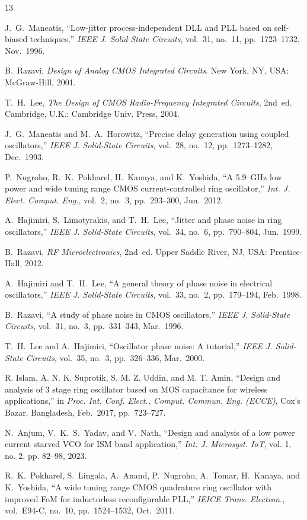 \documentclass[conference,a4paper]{IEEEtran} %
\begin{document}
\begin{thebibliography}{13}

J.~G.~Maneatis, ``Low-jitter process-independent DLL and PLL based on self-biased techniques,'' \emph{IEEE J. Solid-State Circuits}, vol.~31, no.~11, pp.~1723--1732, Nov.~1996.

B.~Razavi, \emph{Design of Analog CMOS Integrated Circuits}. New York, NY, USA: McGraw-Hill, 2001.

T.~H.~Lee, \emph{The Design of CMOS Radio-Frequency Integrated Circuits}, 2nd~ed. Cambridge, U.K.: Cambridge Univ. Press, 2004.

J.~G.~Maneatis and M.~A.~Horowitz, ``Precise delay generation using coupled oscillators,'' \emph{IEEE J. Solid-State Circuits}, vol.~28, no.~12, pp.~1273--1282, Dec.~1993.

P.~Nugroho, R.~K.~Pokharel, H.~Kanaya, and K.~Yoshida, ``A 5.9~GHz low power and wide tuning range CMOS current-controlled ring oscillator,'' \emph{Int. J. Elect. Comput. Eng.}, vol.~2, no.~3, pp.~293--300, Jun.~2012.

A.~Hajimiri, S.~Limotyrakis, and T.~H.~Lee, ``Jitter and phase noise in ring oscillators,'' \emph{IEEE J. Solid-State Circuits}, vol.~34, no.~6, pp.~790--804, Jun.~1999.

B.~Razavi, \emph{RF Microelectronics}, 2nd~ed. Upper Saddle River, NJ, USA: Prentice-Hall, 2012.

A.~Hajimiri and T.~H.~Lee, ``A general theory of phase noise in electrical oscillators,'' \emph{IEEE J. Solid-State Circuits}, vol.~33, no.~2, pp.~179--194, Feb.~1998.

B.~Razavi, ``A study of phase noise in CMOS oscillators,'' \emph{IEEE J. Solid-State Circuits}, vol.~31, no.~3, pp.~331--343, Mar.~1996.

T.~H.~Lee and A.~Hajimiri, ``Oscillator phase noise: A tutorial,'' \emph{IEEE J. Solid-State Circuits}, vol.~35, no.~3, pp.~326--336, Mar.~2000.

R. Islam, A. N. K. Suprotik, S. M. Z. Uddin, and M. T. Amin, ``Design and analysis of 3 stage ring oscillator based on MOS capacitance for wireless applications,'' in \emph{Proc. Int. Conf. Elect., Comput. Commun. Eng. (ECCE)}, Cox's Bazar, Bangladesh, Feb.~2017, pp.~723--727.

N.~Anjum, V.~K.~S.~Yadav, and V.~Nath, ``Design and analysis of a low power current starved VCO for ISM band application,'' \emph{Int. J. Microsyst. IoT}, vol. 1, no. 2, pp. 82--98, 2023.

R.~K.~Pokharel, S.~Lingala, A.~Anand, P.~Nugroho, A.~Tomar, H.~Kanaya, and K.~Yoshida, ``A wide tuning range CMOS quadrature ring oscillator with improved FoM for inductorless reconfigurable PLL,'' \emph{IEICE Trans. Electron.}, vol.~E94-C, no.~10, pp.~1524--1532, Oct.~2011.

\end{thebibliography}
\end{document}
